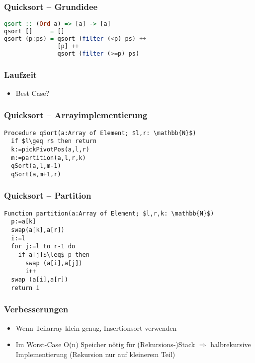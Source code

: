 \begin{frame}[fragile]
\frametitle{Quicksort -- Grundidee}
\begin{lstlisting}[language=Haskell]
qsort :: (Ord a) => [a] -> [a]
qsort []     = []
qsort (p:ps) = qsort (filter (<p) ps) ++
               [p] ++
               qsort (filter (>=p) ps)
\end{lstlisting}
\end{frame}

\begin{frame}
\frametitle{Laufzeit}
\begin{itemize}
\item Best Case? 
\end{itemize}
\end{frame}

\begin{frame}[fragile]
\frametitle{Quicksort -- Arrayimplementierung}
\begin{lstlisting}
Procedure qSort(a:Array of Element; $l,r: \mathbb{N}$)
  if $l\geq r$ then return
  k:=pickPivotPos(a,l,r)
  m:=partition(a,l,r,k)
  qSort(a,l,m-1)
  qSort(a,m+1,r)
\end{lstlisting}
\end{frame}

\begin{frame}[fragile]
\frametitle{Quicksort -- Partition}
\begin{lstlisting}
Function partition(a:Array of Element; $l,r,k: \mathbb{N}$)
  p:=a[k]
  swap(a[k],a[r])
  i:=l
  for j:=l to r-1 do
    if a[j]$\leq$ p then
      swap (a[i],a[j])
      i++
  swap (a[i],a[r])
  return i
\end{lstlisting}
\end{frame}

\begin{frame}
\frametitle{Verbesserungen}
\begin{itemize}
\item Wenn Teilarray klein genug, Insertionsort verwenden\pause
\item Im Worst-Case O(n) Speicher nötig für (Rekursions-)Stack $\Rightarrow$ halbrekursive Implementierung (Rekursion nur auf kleinerem Teil)
\end{itemize}
\end{frame}


